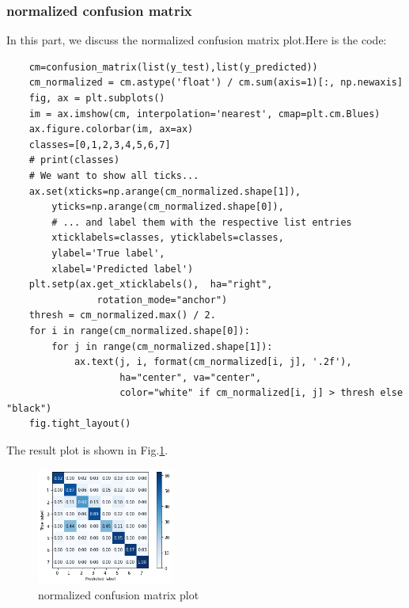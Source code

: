 \documentclass[conference]{IEEEtran}
\begin{document}
\subsubsection{normalized confusion matrix}
In this part, we discuss the normalized confusion matrix plot.Here is the code:
\begin{lstlisting}
    cm=confusion_matrix(list(y_test),list(y_predicted))
    cm_normalized = cm.astype('float') / cm.sum(axis=1)[:, np.newaxis]
    fig, ax = plt.subplots()
    im = ax.imshow(cm, interpolation='nearest', cmap=plt.cm.Blues)
    ax.figure.colorbar(im, ax=ax)
    classes=[0,1,2,3,4,5,6,7]
    # print(classes)
    # We want to show all ticks...
    ax.set(xticks=np.arange(cm_normalized.shape[1]),
        yticks=np.arange(cm_normalized.shape[0]),
        # ... and label them with the respective list entries
        xticklabels=classes, yticklabels=classes,
        ylabel='True label',
        xlabel='Predicted label')
    plt.setp(ax.get_xticklabels(),  ha="right",
                rotation_mode="anchor")
    thresh = cm_normalized.max() / 2.
    for i in range(cm_normalized.shape[0]):
        for j in range(cm_normalized.shape[1]):
            ax.text(j, i, format(cm_normalized[i, j], '.2f'),
                    ha="center", va="center",
                    color="white" if cm_normalized[i, j] > thresh else "black")
    fig.tight_layout()
\end{lstlisting}
The result plot is shown in Fig.\ref{Fig.t3q1c}.
\begin{figure}[h] 
    \centering
    \includegraphics[width=0.4\textwidth]{T3Q1c.png}
    \caption{normalized confusion matrix plot} 
    \label{Fig.t3q1c} 
\end{figure}
\end{document}
